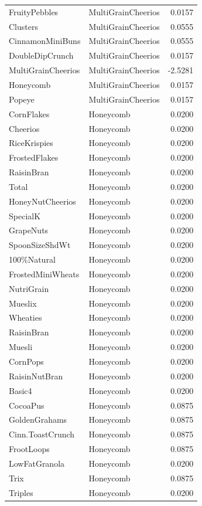 \begin{longtable}{llr}
FruityPebbles & MultiGrainCheerios & 0.0157 \\
Clusters & MultiGrainCheerios & 0.0555 \\
CinnamonMiniBuns & MultiGrainCheerios & 0.0555 \\
DoubleDipCrunch & MultiGrainCheerios & 0.0157 \\
MultiGrainCheerios & MultiGrainCheerios & -2.5281 \\
Honeycomb & MultiGrainCheerios & 0.0157 \\
Popeye & MultiGrainCheerios & 0.0157 \\
CornFlakes & Honeycomb & 0.0200 \\
Cheerios & Honeycomb & 0.0200 \\
RiceKrispies & Honeycomb & 0.0200 \\
FrostedFlakes & Honeycomb & 0.0200 \\
RaisinBran & Honeycomb & 0.0200 \\
Total & Honeycomb & 0.0200 \\
HoneyNutCheerios & Honeycomb & 0.0200 \\
SpecialK & Honeycomb & 0.0200 \\
GrapeNuts & Honeycomb & 0.0200 \\
SpoonSizeShdWt & Honeycomb & 0.0200 \\
100\%Natural & Honeycomb & 0.0200 \\
FrostedMiniWheats & Honeycomb & 0.0200 \\
NutriGrain & Honeycomb & 0.0200 \\
Mueslix & Honeycomb & 0.0200 \\
Wheaties & Honeycomb & 0.0200 \\
RaisinBran & Honeycomb & 0.0200 \\
Muesli & Honeycomb & 0.0200 \\
CornPops & Honeycomb & 0.0200 \\
RaisinNutBran & Honeycomb & 0.0200 \\
Basic4 & Honeycomb & 0.0200 \\
CocoaPus & Honeycomb & 0.0875 \\
GoldenGrahams & Honeycomb & 0.0875 \\
Cinn.ToastCrunch & Honeycomb & 0.0875 \\
FrootLoops & Honeycomb & 0.0875 \\
LowFatGranola & Honeycomb & 0.0200 \\
Trix & Honeycomb & 0.0875 \\
Triples & Honeycomb & 0.0200 \\

\end{longtable}
